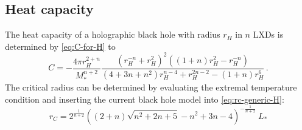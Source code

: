 \documentclass[12pt,a4paper]{report}
\numberwithin{equation}{chapter}
\begin{document}
\subsection{Heat capacity}
The heat capacity of a holographic black hole with radius $r_H$ in $n$ LXDs is determined by \ref{eq:C-for-H} to
\begin{equation}
C = - \frac{4\pi r_H^{2+n}}{M_*^{n+2}}
\frac{ \left(r_H^{-n} + r_H^2\right)^2 \left( (1+n) r_H^2 - r_H^{-n} \right)}
{ \left( 4 + 3n + n^2 \right) r_H^{n-4} + r_H^{2n-2} - (1+n)r_H^6}
\,.
\end{equation}
%
The critical radius can be determined by evaluating the extremal temperature condition and inserting the current black hole model into \eqref{eq:rc-generic-H}:
%
\begin{equation}\label{eq:rc-holo}
r_C = 2^{\frac{1}{n+2}} \left((2+n) \sqrt{n^2+2 n+5}
-n^2+3 n-4\right)^{-\frac{1}{n+2}} ~L_*
\end{equation}
\end{document}
